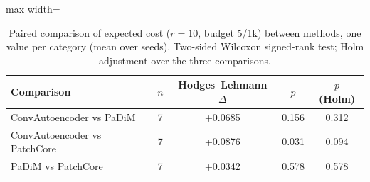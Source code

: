 \begin{table}[tbp]
\centering
\small
\caption{Paired comparison of expected cost ($r=10$, budget 5/1k) between methods, one value per category (mean over seeds). Two-sided Wilcoxon signed-rank test; Holm adjustment over the three comparisons.}
\label{tab:significance}
\begin{adjustbox}{max width=\linewidth}
\begin{tabular}{lcccc}
\toprule
\textbf{Comparison} & \textbf{$n$} & \textbf{Hodges--Lehmann $\Delta$} & \textbf{$p$} & \textbf{$p$ (Holm)} \\
\midrule
ConvAutoencoder vs PaDiM & 7 & +0.0685 & 0.156 & 0.312 \\
ConvAutoencoder vs PatchCore & 7 & +0.0876 & 0.031 & 0.094 \\
PaDiM vs PatchCore & 7 & +0.0342 & 0.578 & 0.578 \\
\bottomrule
\end{tabular}
\end{adjustbox}
\end{table}
